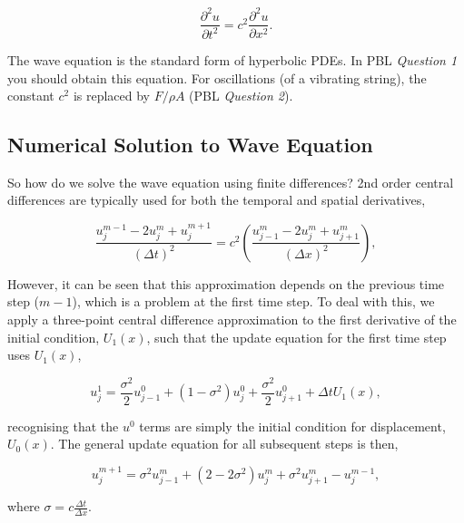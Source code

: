 \documentclass[12pt]{article}
\begin{document}
$$ \frac{\partial^2u}{\partial t^2} = c^2 \frac{\partial^2u}{\partial x^2}. $$

\vspace{4mm}

The wave equation is the standard form of hyperbolic PDEs. In PBL {\it Question 1} you should obtain this equation. For oscillations (of a vibrating string), the constant $c^2$ is replaced by $F/\rho A$ (PBL {\it Question 2}).

\subsection{Numerical Solution to Wave Equation}

So how do we solve the wave equation using finite differences? 2nd order central differences are typically used for both the temporal and spatial derivatives,

\vspace{2mm}

$$ \frac{u_{j}^{m-1} - 2u_j^m + u_{j}^{m+1}}{(\Delta t)^2}  = c^2\left(\frac{u_{j-1}^{m} - 2u_j^m + u_{j+1}^{m}}{(\Delta x)^2}\right), $$

\vspace{4mm}

However, it can be seen that this approximation depends on the previous time step ($m-1$), which is a problem at the first time step. To deal with this, we apply a three-point central difference approximation to the first derivative of the initial condition, $U_1(x)$, such that the update equation for the first time step uses $U_1(x)$,

\vspace{2mm}

$$u_j^1 = \frac{\sigma^2}{2}u_{j-1}^0 + (1-\sigma^2)u_j^0 + \frac{\sigma^2}{2}u_{j+1}^0 + \Delta tU_1(x),$$

\vspace{4mm}

recognising that the $u^0$ terms are simply the initial condition for displacement, $U_0(x)$. The general update equation for all subsequent steps is then,

\vspace{2mm}

$$u_j^{m+1} = \sigma^2 u_{j-1}^m + (2-2\sigma^2)u_j^m + \sigma^2 u_{j+1}^m - u_{j}^{m-1},$$

\vspace{4mm}

where $\sigma=c\frac{\Delta t}{\Delta x}$.
\end{document}
